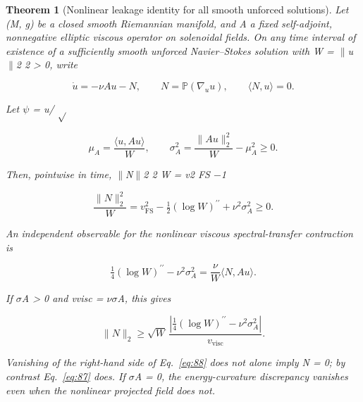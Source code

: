 \documentclass[10pt,letterpaper]{article}
\newtheorem{theorem}{Theorem}[section]
\theoremstyle{remark}
\begin{document}
\begin{theorem}[Nonlinear leakage identity for all smooth unforced solutions]

Let (M, g) be a closed smooth Riemannian manifold, and A a fixed self-adjoint, nonnegative elliptic viscous operator on solenoidal fields. On any time interval of existence of a sufficiently smooth unforced Navier–Stokes solution with W = \(\| \)u\(\| \)2 2 > 0, write


\begin{equation}
\tag{85}\label{eq:85}
\dot u=-\nu Au-N,\qquad N=\mathbb P(\nabla_uu),\qquad\langle N,u\rangle=0.
\end{equation}

Let \(\psi \) = u/ \(\sqrt{} \)



\begin{equation}
\tag{86}\label{eq:86}
\mu_A=\frac{\langle u,Au\rangle}{W},\qquad\sigma_A^2=\frac{\|Au\|_2^2}{W}-\mu_A^2\ge0.
\end{equation}

Then, pointwise in time, \(\| \)N\(\| \)2 2 W = v2 FS \(- \)1



\begin{equation}
\tag{87}\label{eq:87}
\frac{\|N\|_2^2}W=v_{\mathrm{FS}}^2-\tfrac12(\log W)^{\prime\prime}+\nu^2\sigma_A^2\ge0.
\end{equation}

An independent observable for the nonlinear viscous spectral-transfer contraction is



\begin{equation}
\tag{88}\label{eq:88}
\tfrac14(\log W)^{\prime\prime}-\nu^2\sigma_A^2=\frac\nu W\langle N,Au\rangle.
\end{equation}

If \(\sigma \)A > 0 and vvisc = \(\nu \sigma \)A, this gives



\begin{equation}
\tag{89}\label{eq:89}
\|N\|_2\ge\sqrt W\,\frac{|\frac14(\log W)^{\prime\prime}-\nu^2\sigma_A^2|}{v_{\mathrm{visc}}}.
\end{equation}

Vanishing of the right-hand side of Eq.~\eqref{eq:88} does not alone imply N = 0; by contrast Eq.~\eqref{eq:87} does. If \(\sigma \)A = 0, the energy-curvature discrepancy vanishes even when the nonlinear projected field does not.


\end{theorem}
\end{document}
